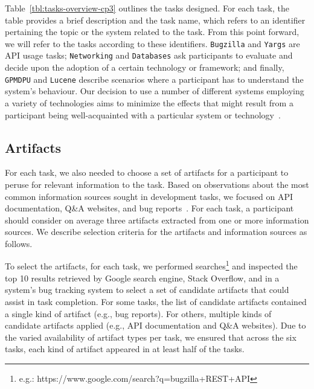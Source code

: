 Table~\ref{tbl:tasks-overview-cp3} outlines the tasks designed.
For each task, the table provides a brief description and the task name, which refers to an identifier pertaining the topic or the system related to the task.
From this point forward, we will refer to the tasks according to these identifiers.
\texttt{Bugzilla} and \texttt{Yargs} are API usage tasks; \texttt{Networking} and \texttt{Databases} ask participants to evaluate and decide upon the adoption of a certain technology or framework; and finally, \texttt{GPMDPU} and \texttt{Lucene} describe scenarios where a participant 
has to understand the system's behaviour. 
Our decision to use a number of different systems employing
a variety of technologies aims to minimize the effects that might result from a participant being
well-acquainted with a particular system or technology~\cite{Wildemuth2012, DeGraaf2014}. 







\subsection{Artifacts}
\label{cp3:method-artifacts}



For each task, we also needed to choose a set of artifacts for a
participant to peruse for relevant information to the task.  Based on
observations about the most common information sources sought in
development tasks,
we focused on API documentation, Q\&A websites, and
bug reports~\cite{Li2013, Ponzanelli2017}.
For each task, a participant should consider on average three artifacts extracted
from one or more information sources.
We describe selection criteria for the artifacts and information sources as follows.



To select the artifacts, for each task, we performed
searches\footnote{
e.g.: https://www.google.com/search?q=bugzilla+REST+API
} and inspected the top 10 results retrieved by Google search engine, Stack Overflow, and in a
system's bug tracking system to select a set of candidate artifacts that could
assist in task completion.
For some tasks, the list of candidate
artifacts contained a single kind of artifact (e.g., bug
reports). For others, multiple kinds of candidate artifacts applied
(e.g., API documentation and Q\&A websites). 
Due to the varied availability of artifact types per task, 
we ensured that across
the six tasks, each kind of artifact appeared in at least half of the
tasks.



